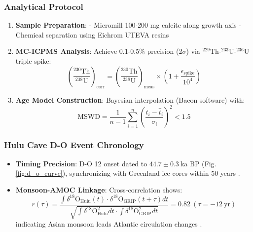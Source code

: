 \documentclass{article}
\begin{document}
\subsubsection*{Analytical Protocol}
\begin{enumerate}
    \item \textbf{Sample Preparation}:  
    - Micromill 100-200 mg calcite along growth axis  
    - Chemical separation using Eichrom UTEVA resins
    
    \item \textbf{MC-ICPMS Analysis}:  
    Achieve 0.1-0.5\% precision (2\(\sigma\)) via \(^{229}\text{Th}\)-\(^{233}\text{U}\)-\(^{236}\text{U}\) triple spike:
    \begin{equation}
        \left(\frac{{}^{230}\text{Th}}{{}^{238}\text{U}}\right)_{\text{corr}} = \left(\frac{{}^{230}\text{Th}}{{}^{238}\text{U}}\right)_{\text{meas}} \times \left(1 + \frac{\epsilon_{\text{spike}}}{10^4}\right)
        \label{eq:spike_corr}
    \end{equation}
    
    \item \textbf{Age Model Construction}:  
    Bayesian interpolation (Bacon software) with:
    \begin{equation}
        \text{MSWD} = \frac{1}{n-1}\sum_{i=1}^n \left(\frac{t_i - \hat{t}_i}{\sigma_i}\right)^2 < 1.5
        \label{eq:mswd}
    \end{equation}
\end{enumerate}

\subsubsection*{Hulu Cave D-O Event Chronology}
\begin{itemize}
    \item \textbf{Timing Precision}:  
    D-O 12 onset dated to \(44.7 \pm 0.3\ \text{ka BP}\) (Fig. \ref{fig:d_o_curve}), synchronizing with Greenland ice cores within 50 years \cite{Wang2001}.
    
    \item \textbf{Monsoon-AMOC Linkage}:  
    Cross-correlation shows:
    \begin{equation}
        r(\tau) = \frac{\int \delta^{18}\text{O}_{\text{Hulu}}(t) \cdot \delta^{18}\text{O}_{\text{GRIP}}(t+\tau) dt}{\sqrt{\int \delta^{18}\text{O}_{\text{Hulu}}^2 dt \cdot \int \delta^{18}\text{O}_{\text{GRIP}}^2 dt}} = 0.82\ (\tau = -12\ \text{yr})
        \label{eq:correlation}
    \end{equation}
    indicating Asian monsoon leads Atlantic circulation changes \cite{Cheng2016}.
\end{itemize}
\end{document}
